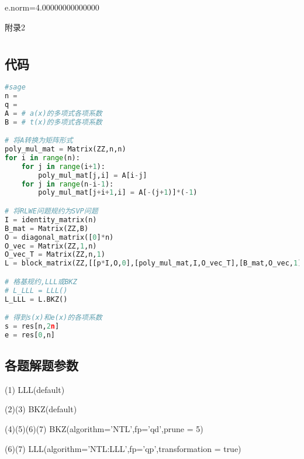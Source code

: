 \documentclass[12pt,a4paper]{article}
\numberwithin{equation}{section}
\begin{document}
e.norm=4.00000000000000

{\centering\heiti\fontsize{14pt}{21pt}\selectfont 附录2\par}
\vspace{1em}
\section{}
\subsection{代码}

\begin{lstlisting}[language=Python]
#sage
n = 
q = 
A = # a(x)的多项式各项系数
B = # t(x)的多项式各项系数

# 将A转换为矩阵形式
poly_mul_mat = Matrix(ZZ,n,n)
for i in range(n):
    for j in range(i+1):
        poly_mul_mat[j,i] = A[i-j]
    for j in range(n-i-1):
        poly_mul_mat[j+i+1,i] = A[-(j+1)]*(-1)

# 将RLWE问题规约为SVP问题
I = identity_matrix(n)
B_mat = Matrix(ZZ,B)
O = diagonal_matrix([0]*n)
O_vec = Matrix(ZZ,1,n)
O_vec_T = Matrix(ZZ,n,1)
L = block_matrix(ZZ,[[p*I,O,0],[poly_mul_mat,I,O_vec_T],[B_mat,O_vec,1]]) # kannan embedding

# 格基规约,LLL或BKZ
# L_LLL = LLL()
L_LLL = L.BKZ()

# 得到s(x)和e(x)的各项系数
s = res[n,2n]
e = res[0,n]
\end{lstlisting}

\subsection{各题解题参数}

(1) LLL(default)

(2)(3) BKZ(default)

(4)(5)(6)(7) BKZ(algorithm='NTL',fp='qd',prune = 5)

(6)(7) LLL(algorithm='NTL:LLL',fp='qp',transformation = true)

\vspace{1em}

{\songti\fontsize{12pt}{18pt}\selectfont
	
}
%
\end{document}
